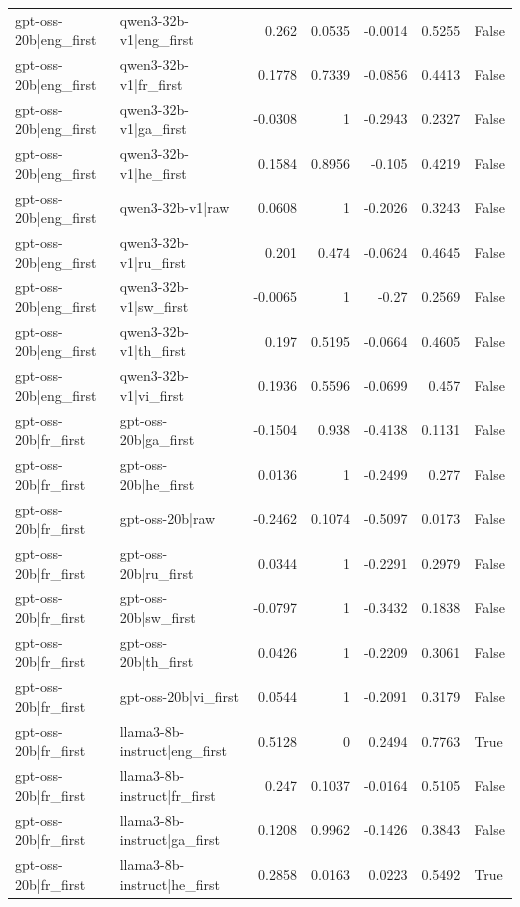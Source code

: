 \begin{table}
\begin{tabular}{l l r r r r l}
gpt-oss-20b|eng_first & qwen3-32b-v1|eng_first & 0.262 & 0.0535 & -0.0014 & 0.5255 & False \\
gpt-oss-20b|eng_first & qwen3-32b-v1|fr_first & 0.1778 & 0.7339 & -0.0856 & 0.4413 & False \\
gpt-oss-20b|eng_first & qwen3-32b-v1|ga_first & -0.0308 & 1 & -0.2943 & 0.2327 & False \\
gpt-oss-20b|eng_first & qwen3-32b-v1|he_first & 0.1584 & 0.8956 & -0.105 & 0.4219 & False \\
gpt-oss-20b|eng_first & qwen3-32b-v1|raw & 0.0608 & 1 & -0.2026 & 0.3243 & False \\
gpt-oss-20b|eng_first & qwen3-32b-v1|ru_first & 0.201 & 0.474 & -0.0624 & 0.4645 & False \\
gpt-oss-20b|eng_first & qwen3-32b-v1|sw_first & -0.0065 & 1 & -0.27 & 0.2569 & False \\
gpt-oss-20b|eng_first & qwen3-32b-v1|th_first & 0.197 & 0.5195 & -0.0664 & 0.4605 & False \\
gpt-oss-20b|eng_first & qwen3-32b-v1|vi_first & 0.1936 & 0.5596 & -0.0699 & 0.457 & False \\
gpt-oss-20b|fr_first & gpt-oss-20b|ga_first & -0.1504 & 0.938 & -0.4138 & 0.1131 & False \\
gpt-oss-20b|fr_first & gpt-oss-20b|he_first & 0.0136 & 1 & -0.2499 & 0.277 & False \\
gpt-oss-20b|fr_first & gpt-oss-20b|raw & -0.2462 & 0.1074 & -0.5097 & 0.0173 & False \\
gpt-oss-20b|fr_first & gpt-oss-20b|ru_first & 0.0344 & 1 & -0.2291 & 0.2979 & False \\
gpt-oss-20b|fr_first & gpt-oss-20b|sw_first & -0.0797 & 1 & -0.3432 & 0.1838 & False \\
gpt-oss-20b|fr_first & gpt-oss-20b|th_first & 0.0426 & 1 & -0.2209 & 0.3061 & False \\
gpt-oss-20b|fr_first & gpt-oss-20b|vi_first & 0.0544 & 1 & -0.2091 & 0.3179 & False \\
gpt-oss-20b|fr_first & llama3-8b-instruct|eng_first & 0.5128 & 0 & 0.2494 & 0.7763 & True \\
gpt-oss-20b|fr_first & llama3-8b-instruct|fr_first & 0.247 & 0.1037 & -0.0164 & 0.5105 & False \\
gpt-oss-20b|fr_first & llama3-8b-instruct|ga_first & 0.1208 & 0.9962 & -0.1426 & 0.3843 & False \\
gpt-oss-20b|fr_first & llama3-8b-instruct|he_first & 0.2858 & 0.0163 & 0.0223 & 0.5492 & True \\

\end{tabular}
\end{table}
